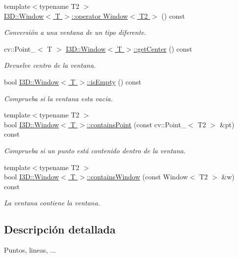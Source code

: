 \begin{DoxyCompactItemize}
{\footnotesize template$<$typename T2 $>$ }\\\hyperlink{group___geometric_entities_ga0735f1f595e1d9feece5975ef4c886ce}{I3\+D\+::\+Window$<$ T $>$\+::operator Window$<$ T2 $>$} () const 
\begin{DoxyCompactList}\small\item\em Conversión a una ventana de un tipo diferente. \end{DoxyCompactList}\item 
cv\+::\+Point\+\_\+$<$ T $>$ \hyperlink{group___geometric_entities_gacddf95309d8471ebffc0c51ce4fa9055}{I3\+D\+::\+Window$<$ T $>$\+::get\+Center} () const 
\begin{DoxyCompactList}\small\item\em Devuelve centro de la ventana. \end{DoxyCompactList}\item 
bool \hyperlink{group___geometric_entities_ga538a75457375309a2a519a8b40185bf3}{I3\+D\+::\+Window$<$ T $>$\+::is\+Empty} () const 
\begin{DoxyCompactList}\small\item\em Comprueba si la ventana esta vacia. \end{DoxyCompactList}\item 
{\footnotesize template$<$typename T2 $>$ }\\bool \hyperlink{group___geometric_entities_gadedaaec93c260131acb5bf30b2e14dda}{I3\+D\+::\+Window$<$ T $>$\+::contains\+Point} (const cv\+::\+Point\+\_\+$<$ T2 $>$ \&pt) const 
\begin{DoxyCompactList}\small\item\em Comprueba si un punto está contenido dentro de la ventana. \end{DoxyCompactList}\item 
{\footnotesize template$<$typename T2 $>$ }\\bool \hyperlink{group___geometric_entities_ga39b646714c642da0cce15bfe311d1d5c}{I3\+D\+::\+Window$<$ T $>$\+::contains\+Window} (const Window$<$ T2 $>$ \&w) const 
\begin{DoxyCompactList}\small\item\em La ventana contiene la ventana. \end{DoxyCompactList}\end{DoxyCompactItemize}


\subsection{Descripción detallada}
Puntos, lineas, ... 

